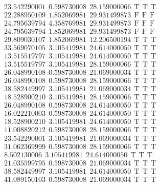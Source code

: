 \documentclass[10pt,a4paper]{article}
\begin{document}
\begin{itemize}
\begin{displaymath}
{\begin{aligned}
&23.542290001 ~~   0.598730008 ~~  28.159000066  ~~\mathrm{T  ~~ T  ~~ T } \\ 
&22.288950109 ~~   1.852069981 ~~  29.931499873  ~~\mathrm{F  ~~ F  ~~  F} \\ 
&24.795639794 ~~   4.358769981 ~~  29.931499873  ~~\mathrm{F  ~~ F  ~~  F} \\ 
&24.795639794 ~~   1.852069981 ~~  29.931499873  ~~\mathrm{F  ~~ F  ~~  F} \\ 
&29.809030107 ~~   1.852069981 ~~  12.206500194  ~~\mathrm{T  ~~ T  ~~ T } \\ 
&33.569070105 ~~   3.105419981 ~~  24.614000050  ~~\mathrm{T  ~~ T  ~~ T } \\ 
&13.515519797 ~~   3.105419981 ~~  24.614000050  ~~\mathrm{T  ~~ T  ~~ T } \\ 
&13.515519797 ~~   3.105419981 ~~  28.159000066  ~~\mathrm{T  ~~ T  ~~ T } \\ 
&26.048990108 ~~   0.598730008 ~~  21.069000034  ~~\mathrm{T  ~~ T  ~~ T } \\ 
&26.048990108 ~~   0.598730008 ~~  28.159000066  ~~\mathrm{T  ~~ T  ~~ T } \\ 
&38.582449997 ~~   3.105419981 ~~  21.069000034  ~~\mathrm{T  ~~ T  ~~ T } \\ 
&18.528900210 ~~   3.105419981 ~~  28.159000066  ~~\mathrm{T  ~~ T  ~~ T } \\ 
&26.048990108 ~~   0.598730008 ~~  24.614000050  ~~\mathrm{T  ~~ T  ~~ T } \\ 
&16.022210003 ~~   0.598730008 ~~  24.614000050  ~~\mathrm{T  ~~ T  ~~ T } \\ 
&18.528900210 ~~   3.105419981 ~~  24.614000050  ~~\mathrm{T  ~~ T  ~~ T } \\ 
&11.008820212 ~~   0.598730008 ~~  28.159000066  ~~\mathrm{T  ~~ T  ~~ T } \\ 
&23.542290001 ~~   3.105419981 ~~  21.069000034  ~~\mathrm{T  ~~ T  ~~ T } \\ 
&31.062369999 ~~   0.598730008 ~~  28.159000066  ~~\mathrm{T  ~~ T  ~~ T } \\ 
& 8.502130006 ~~   3.105419981 ~~  24.614000050  ~~\mathrm{T  ~~ T  ~~ T } \\ 
&21.035599795 ~~   0.598730008 ~~  21.069000034  ~~\mathrm{T  ~~ T  ~~ T } \\ 
&38.582449997 ~~   3.105419981 ~~  24.614000050  ~~\mathrm{T  ~~ T  ~~ T } \\ 
&41.089150103 ~~   0.598730008 ~~  21.069000034  ~~\mathrm{T  ~~ T  ~~ T } \\ 

\end{aligned}}
\end{displaymath}
\end{itemize}
\end{document}
